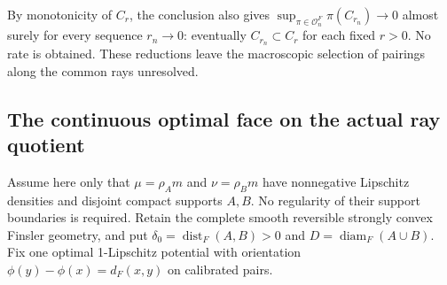\documentclass[11pt,reqno]{amsart}
\theoremstyle{definition}
\theoremstyle{remark}
\numberwithin{equation}{section}
\begin{document}
By monotonicity of \(C_r\), the conclusion also gives
\(\sup_{\pi\in\mathcal O_n^F}\pi(C_{r_n})\to0\) almost surely
for every sequence \(r_n\to0\): eventually \(C_{r_n}\subset C_r\)
for each fixed \(r>0\). No rate is obtained. These reductions
leave the macroscopic selection of pairings along the common rays
unresolved.

\subsection{The continuous optimal face on the actual ray quotient}
\label{subsec:general-optimal-face}

Assume here only that \(\mu=\rho_A m\) and \(\nu=\rho_B m\)
have nonnegative Lipschitz densities and disjoint compact supports
\(A,B\). No regularity of their support boundaries is required.
Retain the complete smooth reversible strongly convex Finsler geometry,
and put \(\delta_0=\operatorname{dist}_F(A,B)>0\) and
\(D=\operatorname{diam}_F(A\cup B)\). Fix one optimal
1-Lipschitz potential with orientation
\(\phi(y)-\phi(x)=d_F(x,y)\) on calibrated pairs.
\end{document}
